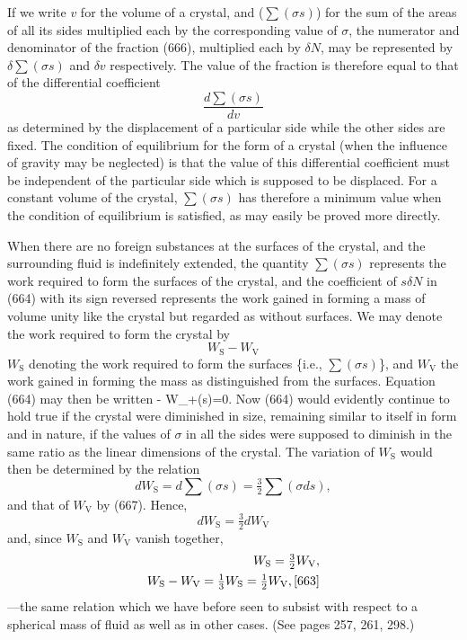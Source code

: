 \documentclass[12pt]{memoir}
\newcommand{\dd}{\delta}
\begin{document}
If we write $v$ for the volume of a crystal, and ($\sum(\sigma s)$) for the sum of the areas of all its sides multiplied each by the corresponding value of $\sigma$, the numerator and denominator of the fraction (666), multiplied each by $\dd N$, may be represented by $\dd \sum(\sigma s)$ and $\dd v$ respectively. The value of the fraction is therefore equal to that of the differential coefficient
$$ \frac{d \sum(\sigma s)}{dv} $$
as determined by the displacement of a particular side while the other sides are fixed. The condition of equilibrium for the form of a crystal (when the influence of gravity may be neglected) is that the value of this differential coefficient must be independent of the particular side which is supposed to be displaced. For a constant volume of the crystal, $\sum(\sigma s)$ has therefore a minimum value when the condition of equilibrium is satisfied, as may easily be proved more directly.

When there are no foreign substances at the surfaces of the crystal, and the surrounding fluid is indefinitely extended, the quantity $\sum(\sigma s)$ represents the work required to form the surfaces of the crystal, and the coefficient of $s \dd N$ in (664) with its sign reversed represents the work gained in forming a mass of volume unity like the crystal but regarded as without surfaces. We may denote the work required to form the crystal by
$$ W_\text{S}-W_\text{V} $$
$W_\text{S}$ denoting the work required to form the surfaces \{i.e., $\sum(\sigma s)$\}, and $W_\text{V}$ the work gained in forming the mass as distinguished from the surfaces. Equation (664) may then be written
\eqs - \dd W_+\sum(\sigma \dd s)=0.  \label{667}\eqe
Now (664) would evidently continue to hold true if the crystal were diminished in size, remaining similar to itself in form and in nature, if the values of $\sigma$ in all the sides were supposed to diminish in the same ratio as the linear dimensions of the crystal. The variation of $W_\text{S}$ would then be determined by the relation
$$dW_\text{S}= d \sum(\sigma s) = \tfrac{3}{2}\sum(\sigma ds),$$
and that of $W_\text{V}$ by (667). Hence,
$$dW_\text{S}= \tfrac{3}{2}d W_\text{V}$$
and, since $W_\text{S}$ and $W_\text{V}$ vanish together,
\begin{align}
W_\text{S}= \tfrac{3}{2} W_\text{V}, \nonumber \\
W_\text{S}- W_\text{V} = \tfrac{1}{3}W_\text{S} = \tfrac{1}{2} W_\text{V},    \ref{663}\end{align}
---the same relation which we have before seen to subsist with respect to a spherical mass of fluid as well as in other cases. (See pages 257, 261, 298.)
\end{document}

